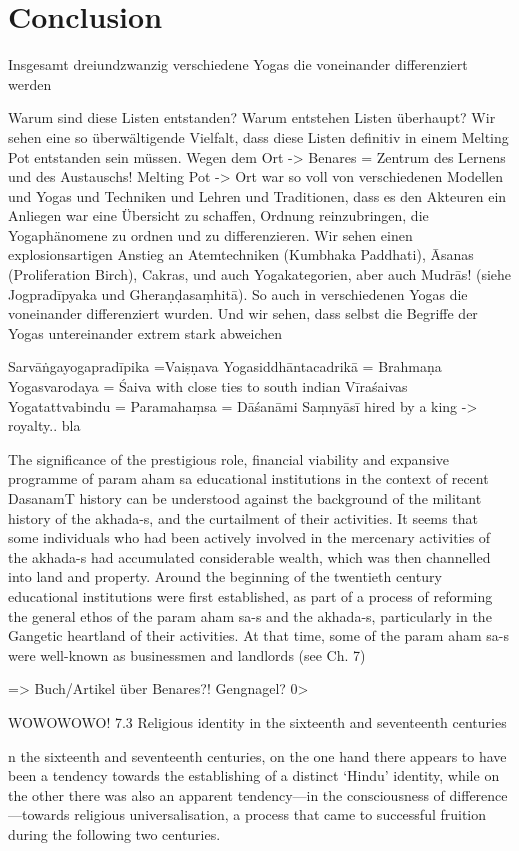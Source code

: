 \section{Conclusion}

Insgesamt dreiundzwanzig verschiedene Yogas die voneinander differenziert werden 

Warum sind diese Listen entstanden?
Warum entstehen Listen überhaupt?
Wir sehen eine so überwältigende Vielfalt, dass diese Listen definitiv in einem Melting Pot entstanden sein müssen. 
Wegen dem Ort -> Benares = Zentrum des Lernens und des Austauschs!  Melting Pot -> Ort war so voll von verschiedenen Modellen und Yogas und Techniken und Lehren und Traditionen, dass es den Akteuren ein Anliegen war eine Übersicht zu schaffen, Ordnung reinzubringen, die Yogaphänomene zu ordnen und zu differenzieren.
Wir sehen einen explosionsartigen Anstieg an Atemtechniken (Kumbhaka Paddhati), Āsanas (Proliferation Birch), Cakras, und auch Yogakategorien, aber auch Mudrās! (siehe Jogpradīpyaka und Gheraṇḍasaṃhitā). So auch in verschiedenen Yogas die voneinander differenziert wurden. Und wir sehen, dass selbst die Begriffe der Yogas untereinander extrem stark abweichen

Sarvāṅgayogapradīpika =Vaiṣṇava
Yogasiddhāntacadrikā = Brahmaṇa
Yogasvarodaya = Śaiva with close ties to south indian Vīraśaivas
Yogatattvabindu = Paramahaṃsa = Dāśanāmi Saṃnyāsī hired by a king -> royalty.. bla 

 The significance of
the prestigious role, financial viability and expansive programme of param aham sa
educational institutions in the context of recent DasanamT history can be understood against
the background of the militant history of the akhada-s, and the curtailment of their activities. It
seems that some individuals who had been actively involved in the mercenary activities of
the akhada-s had accumulated considerable wealth, which was then channelled into land
and property. Around the beginning of the twentieth century educational institutions were
first established, as part of a process of reforming the general ethos of the param aham sa-s
and the akhada-s, particularly in the Gangetic heartland of their activities. At that time, some
of the param aham sa-s were well-known as businessmen and landlords (see Ch. 7)


=> Buch/Artikel über Benares?! Gengnagel?
0>



WOWOWOWO! 7.3 Religious identity in the sixteenth and seventeenth centuries

n the sixteenth and seventeenth centuries, on the one hand there appears to
have been a tendency towards the establishing of a distinct ‘Hindu’ identity, while on the
other there was also an apparent tendency—in the consciousness of
difference—towards religious universalisation, a process that came to successful fruition
during the following two centuries.


